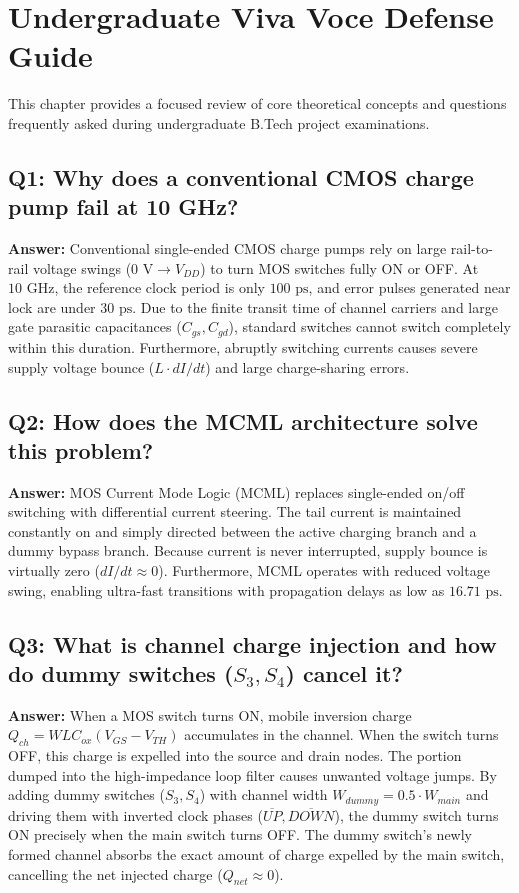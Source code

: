 \documentclass[11pt,a4paper]{report}
\begin{document}
\newpage

\chapter{Undergraduate Viva Voce Defense Guide}

This chapter provides a focused review of core theoretical concepts and questions frequently asked during undergraduate B.Tech project examinations.

\section*{Q1: Why does a conventional CMOS charge pump fail at 10 GHz?}
\textbf{Answer:} Conventional single-ended CMOS charge pumps rely on large rail-to-rail voltage swings ($0\text{ V} \to V_{DD}$) to turn MOS switches fully ON or OFF. At $10\text{ GHz}$, the reference clock period is only $100\text{ ps}$, and error pulses generated near lock are under $30\text{ ps}$. Due to the finite transit time of channel carriers and large gate parasitic capacitances ($C_{gs}, C_{gd}$), standard switches cannot switch completely within this duration. Furthermore, abruptly switching currents causes severe supply voltage bounce ($L \cdot dI/dt$) and large charge-sharing errors.

\section*{Q2: How does the MCML architecture solve this problem?}
\textbf{Answer:} MOS Current Mode Logic (MCML) replaces single-ended on/off switching with differential current steering. The tail current is maintained constantly on and simply directed between the active charging branch and a dummy bypass branch. Because current is never interrupted, supply bounce is virtually zero ($dI/dt \approx 0$). Furthermore, MCML operates with reduced voltage swing, enabling ultra-fast transitions with propagation delays as low as $16.71\text{ ps}$.

\section*{Q3: What is channel charge injection and how do dummy switches ($S_3, S_4$) cancel it?}
\textbf{Answer:} When a MOS switch turns ON, mobile inversion charge $Q_{ch} = W L C_{ox} (V_{GS} - V_{TH})$ accumulates in the channel. When the switch turns OFF, this charge is expelled into the source and drain nodes. The portion dumped into the high-impedance loop filter causes unwanted voltage jumps. 
By adding dummy switches ($S_3, S_4$) with channel width $W_{dummy} = 0.5 \cdot W_{main}$ and driving them with inverted clock phases ($\overline{UP}, \overline{DOWN}$), the dummy switch turns ON precisely when the main switch turns OFF. The dummy switch's newly formed channel absorbs the exact amount of charge expelled by the main switch, cancelling the net injected charge ($Q_{net} \approx 0$).
\end{document}
